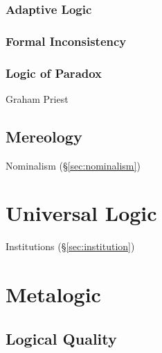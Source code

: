 \subsubsection{Adaptive Logic}\label{sec:adaptive_logic}

\subsubsection{Formal Inconsistency}\label{sec:formal_inconsistency}

\subsubsection{Logic of Paradox}\label{sec:logic_of_paradox}

Graham Priest



\subsection{Mereology}\label{sec:mereology}

Nominalism (\S\ref{sec:nominalism})



\section{Universal Logic}\label{sec:universal_logic}

Institutions (\S\ref{sec:institution})



\section{Metalogic}\label{sec:metalogic}

\subsection{Logical Quality}\label{sec:logical_quality}

